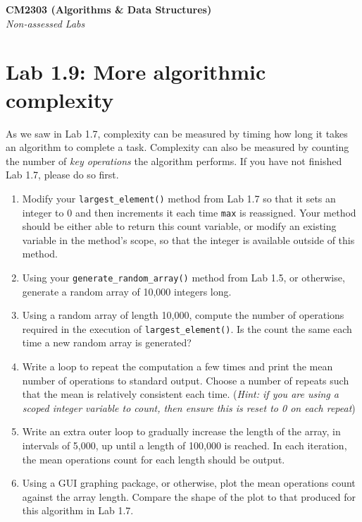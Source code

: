 \documentclass[11pt,a4paper]{report}
\begin{document}
\noindent\Large\textbf{CM2303 (Algorithms \& Data Structures)}\\
\noindent\large\textit{Non-assessed Labs}
\vskip30pt

\section*{Lab 1.9: More algorithmic complexity}

As we saw in Lab 1.7, complexity can be measured by timing how long it takes an algorithm to complete a task. Complexity can also be measured by counting the number of \textit{key operations} the algorithm performs. If you have not finished Lab 1.7, please do so first.

\vskip20pt

\begin{enumerate}

    \item Modify your \texttt{largest\_element()} method from Lab 1.7 so that it sets an integer to 0 and then increments it each time \texttt{max} is reassigned. Your method should be either able to return this count variable, or modify an existing variable in the method's scope, so that the integer is available outside of this method.

    \item Using your \texttt{generate\_random\_array()} method from Lab 1.5, or otherwise, generate a random array of 10,000 integers long.

    \item Using a random array of length 10,000, compute the number of operations required in the execution of \texttt{largest\_element()}. Is the count the same each time a new random array is generated?

    \item Write a loop to repeat the computation a few times and print the mean number of operations to standard output. Choose a number of repeats such that the mean is relatively consistent each time. (\textit{Hint: if you are using a scoped integer variable to count, then ensure this is reset to 0 on each repeat})

    \item Write an extra outer loop to gradually increase the length of the array, in intervals of 5,000, up until a length of 100,000 is reached. In each iteration, the mean operations count for each length should be output.

    \item Using a GUI graphing package, or otherwise, plot the mean operations count against the array length. Compare the shape of the plot to that produced for this algorithm in Lab 1.7. 


\end{enumerate}
\end{document}
